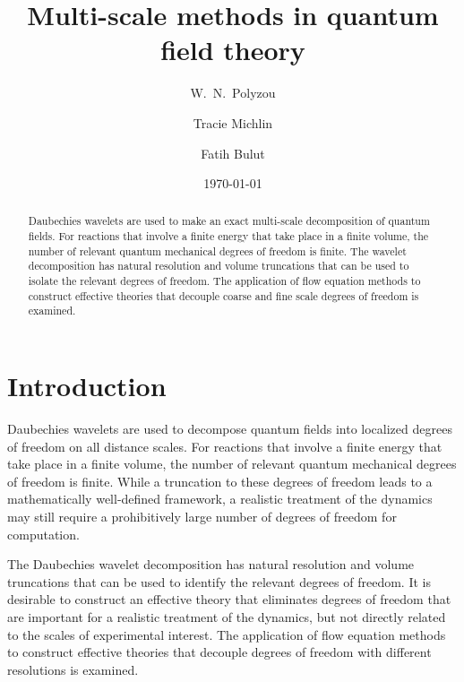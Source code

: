 \documentclass[aps,prc,reprint,showpacs,groupedaddress,onecolumn]{revtex4}
\begin{document}
\title{Multi-scale methods in quantum field theory}

\author{W.~N.~Polyzou} 

\author{Tracie Michlin} 

\author{Fatih Bulut} 

\date{\today}

\pacs{}

\begin{abstract}

  Daubechies wavelets are used to make an exact multi-scale
  decomposition of quantum fields.  For reactions that involve a
  finite energy that take place in a finite volume, the number of
  relevant quantum mechanical degrees of freedom is finite.  The
  wavelet decomposition has natural resolution and volume truncations
  that can be used to isolate the relevant degrees of freedom.  The
  application of flow equation methods to construct effective theories
  that decouple coarse and fine scale degrees of freedom is
  examined.

\end{abstract}
\maketitle


\section{Introduction}
\label{intro}

Daubechies wavelets \cite{Daubechies}\cite{Daubechies2} are used to
decompose quantum fields into localized degrees of freedom on all
distance scales.  For reactions that involve a finite energy that take
place in a finite volume, the number of relevant quantum mechanical
degrees of freedom is finite.  While a truncation to these degrees of
freedom leads to a mathematically well-defined framework, a realistic
treatment of the dynamics may still require a prohibitively large
number of degrees of freedom for computation.

The Daubechies wavelet decomposition has natural resolution and volume
truncations that can be used to identify the relevant degrees of
freedom.  It is desirable to construct an effective theory that
eliminates degrees of freedom that are important for a realistic
treatment of the dynamics, but not directly related to the scales of
experimental interest.  The application of flow equation methods to
construct effective theories that decouple degrees of freedom with
different resolutions is examined.
\end{document}
